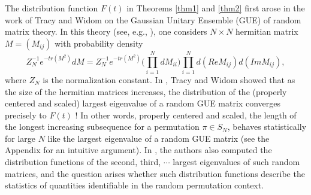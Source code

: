 \documentclass{amsart}
\theoremstyle{definition}
\theoremstyle{remark}
\numberwithin{equation}{section}
\begin{document}
\bigskip
The distribution function $F(t)$ in Theorems \ref{thm1} and \ref{thm2} 
first arose in the work of Tracy and Widom on 
the Gaussian Unitary Ensemble (GUE) of random matrix theory.
In this theory (see, e.g., \cite{Me}), one considers $N\times N$ 
hermitian matrix $M=(M_{ij})$ with probability density
\begin{equation*}
   Z_N^{-1}e^{-tr(M^2)}dM
=Z_N^{-1}e^{-tr(M^2)} \biggl(\prod_{i=1}^{N} dM_{ii}\biggr) 
\prod_{i=1}^{N} d(ReM_{ij}) d(ImM_{ij}),
\end{equation*}
where $Z_N$ is the normalization constant.
In \cite{TW}, Tracy and Widom showed that 
as the size of the hermitian matrices increases, 
the distribution of the (properly centered and scaled) largest 
eigenvalue of a random GUE matrix 
converges precisely to $F(t)$ !
In other words, properly centered and scaled, the length of the longest 
increasing subsequence for a permutation $\pi\in S_N$, behaves statistically 
for large $N$ like the largest eigenvalue of a random GUE matrix 
(see the Appendix for an intuitive argument).
In \cite{TW}, the authors also computed the distribution functions of 
the second, third, $\cdots$ largest eigenvalues of such random matrices, 
and the question arises whether such distribution functions describe 
the statistics of quantities identifiable in the random permutation 
context.
\end{document}
